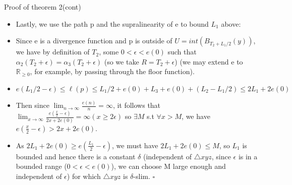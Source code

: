 \documentclass[11pt]{beamer}
\begin{document}
	\begin{frame}{Proof of theorem 2(cont)}
		
		\begin{itemize}
			\item Lastly, we use the path p and the supralinearity of e to bound $L_1$ above: 
			
			\item Since e is a divergence function and p is outside of $U = int(B_{T_2 + L_1/2}(y))$, we have by definition of $T_2$, some $0 < \epsilon < e(0)$ such that $\alpha_2(T_2 + \epsilon) = \alpha_3(T_2 + \epsilon)$ (so we take $R = T_2 + \epsilon$) (we may extend e to $\mathbb{R}_{\geq 0}$, for example, by passing through the floor function). 
			
			
			\item $e(L_1/2 - \epsilon) \leq \ell(p) \leq L_1/2 + e(0) + L_3 + e(0) + (L_2 - L_1/2) \leq 2L_1 + 2e(0)$
			
			\item Then since $\lim_{n \rightarrow \infty}\frac{e(n)}{n} = \infty $, it follows that $\lim_{x \rightarrow \infty}\frac{e(\frac{x}{2} - \epsilon)}{2x + 2e(0)}  = \infty ( x \geq 2\epsilon)$
			so $\exists M$ s.t $\forall x>M$, we have $e(\frac{x}{2} - \epsilon) > 2x + 2e(0)$. 
			\item As $2L_1 + 2e(0) \geq e(\frac{L_1}{2} - \epsilon)$, we must have $2L_1 + 2e(0) \leq M$, so $L_1$ is bounded and hence there is a constant $\delta$ (independent of $\triangle xyz$, since $\epsilon$ is in a bounded range ($0 < \epsilon < e(0)$), we can choose M large enough and independent of $\epsilon$) for which $\triangle xyz$ is $\delta$-slim. 
			$\square$
		\end{itemize}
		
	\end{frame}
	
\end{document}
